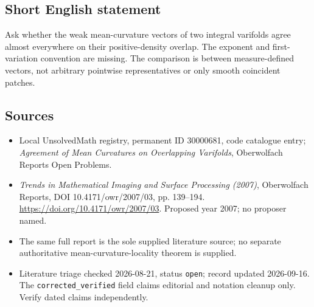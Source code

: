\documentclass[11pt]{article}
\begin{document}
\subsection{Short English statement}
Ask whether the weak mean-curvature vectors of two integral varifolds agree almost everywhere on their positive-density overlap. The exponent and first-variation convention are missing. The comparison is between measure-defined vectors, not arbitrary pointwise representatives or only smooth coincident patches.
\subsection{Sources}
\begin{itemize}\item Local UnsolvedMath registry, permanent ID 30000681, code catalogue entry; \emph{Agreement of Mean Curvatures on Overlapping Varifolds}, Oberwolfach Reports Open Problems.\item \emph{Trends in Mathematical Imaging and Surface Processing (2007)}, Oberwolfach Reports, DOI 10.4171/owr/2007/03, pp. 139--194. \url{https://doi.org/10.4171/owr/2007/03}. Proposed year 2007; no proposer named.\item The same full report is the sole supplied literature source; no separate authoritative mean-curvature-locality theorem is supplied.\item Literature triage checked 2026-08-21, status \texttt{open}; record updated 2026-09-16. The \texttt{corrected\_verified} field claims editorial and notation cleanup only. Verify dated claims independently.\end{itemize}
\end{document}
